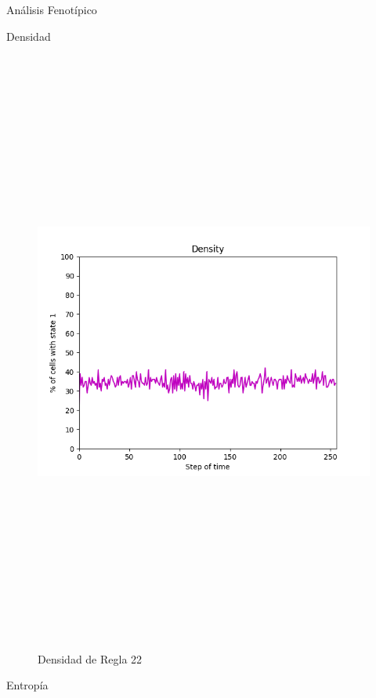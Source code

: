 \documentclass[12pt, letterpaper]{article}
\renewcommand{\rule}{Regla 22}
\begin{document}
\begin{section}{Análisis Fenotípico} 
  \begin{subsection}{Densidad} 
    \begin{figure}[H] 
      \centering 
       \includegraphics[max width=200mm ,max height=200mm , keepaspectratio ]{SimDensity.png} 
       \caption{Densidad de \rule} 
    \end{figure} 
  \end{subsection} 
  \begin{subsection}{Entropía} 
    \begin{figure}[H] 
    \centering 

\end{figure}
\end{subsection}
\end{section}
\end{document}
